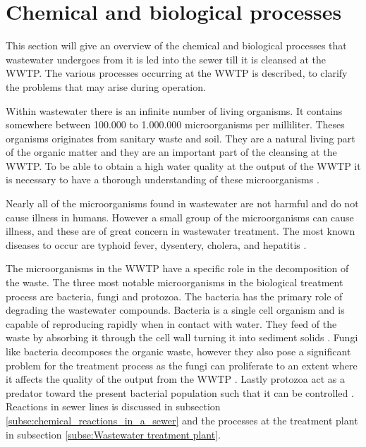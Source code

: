 \section{Chemical and biological processes}\label{se:chemical_process}
This section will give an overview of the chemical and biological processes that wastewater undergoes from it is led into the sewer till it is cleansed at the WWTP. The various processes occurring at the WWTP is described, to clarify the problems that may arise during operation. 

Within wastewater there is an infinite number of living organisms.%
 It contains somewhere between 100.000 to 1.000.000 microorganisms per milliliter. Theses organisms originates from sanitary waste and soil. They are a natural living part of the organic matter and they are an important part of the cleansing at the WWTP. To be able to obtain a high water quality at the output of the WWTP it is necessary to have a thorough understanding of these microorganisms \cite{biological_wastewater}. %

Nearly all of the microorganisms found in wastewater are not harmful and do not cause illness in humans. However a small group of the microorganisms can cause illness, and these are of great concern in wastewater treatment. The most known diseases to occur are typhoid fever, dysentery, cholera, and hepatitis \cite{biological_wastewater}.

The microorganisms in the WWTP have a specific role in the decomposition of the waste. The three most notable microorganisms in the biological treatment process are bacteria, fungi and protozoa. The bacteria has the primary role of degrading the wastewater compounds.  Bacteria is a single cell organism and is capable of reproducing rapidly when in contact with water. They feed of the waste by absorbing it through the cell wall turning it into sediment solids \cite{biological_wastewater}. 
Fungi like bacteria decomposes the organic waste, however they also pose a significant problem for the treatment process as the fungi can proliferate to an extent where it affects the quality of the output from the WWTP \cite{fungi_source}. 
Lastly protozoa act as a predator toward the present bacterial population such that it can be controlled \cite{biological_wastewater}. Reactions in sewer lines is discussed in subsection \ref{subse:chemical_reactions_in_a_sewer} and the processes at the treatment plant in subsection \ref{subse:Wastewater treatment plant}.

